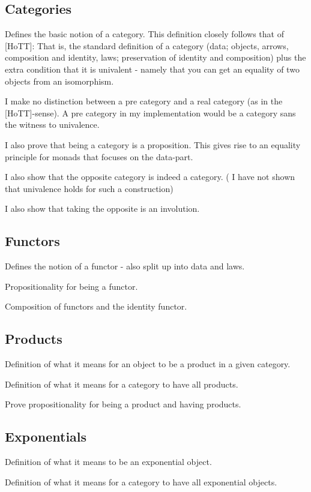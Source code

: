 \subsection{Categories}
Defines the basic notion of a category. This definition closely follows that of
[HoTT]: That is, the standard definition of a category (data; objects, arrows,
composition and identity, laws; preservation of identity and composition) plus
the extra condition that it is univalent - namely that you can get an equality
of two objects from an isomorphism.

I make no distinction between a pre category and a real category (as in the
[HoTT]-sense). A pre category in my implementation would be a category sans the
witness to univalence.

I also prove that being a category is a proposition. This gives rise to an
equality principle for monads that focuses on the data-part.

I also show that the opposite category is indeed a category. (\WIP{} I have not
shown that univalence holds for such a construction)

I also show that taking the opposite is an involution.

\subsection{Functors}
Defines the notion of a functor - also split up into data and laws.

Propositionality for being a functor.

Composition of functors and the identity functor.

\subsection{Products}
Definition of what it means for an object to be a product in a given category.

Definition of what it means for a category to have all products.

\WIP{} Prove propositionality for being a product and having products.

\subsection{Exponentials}
Definition of what it means to be an exponential object.

Definition of what it means for a category to have all exponential objects.

